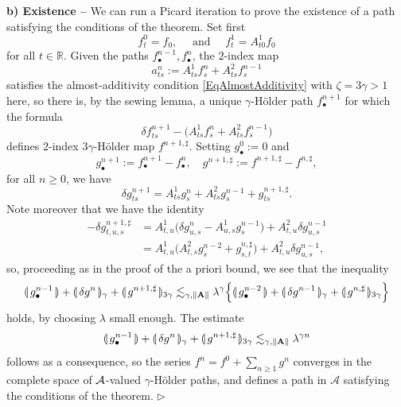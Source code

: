 \documentclass[11pt,a4paper]{amsart}
\newcommand{\RR}{\mathbb{R}}  \newcommand{\CC}{\mathbb{C}}  \newcommand{\LL}{\mathbb{L}}  \newcommand{\WW}{\mathbb{W}}
\renewcommand{\geq}{\geqslant}
\numberwithin{equation}{section} %
\newenvironment{Dem}{%
    \begin{list}{\hspace{0.5cm}{\sc Proof --}}{%
        \setlength{\topsep}{0pt}%
        \setlength{\leftmargin}{0pt}%
        \setlength{\rightmargin}{0pt}%
        \setlength{\listparindent}{0pt}%
        \setlength{\itemindent}{0pt}%
        \setlength{\parsep}{0pt}%
        \addtolength{\leftmargin}{20pt}%
        \addtolength{\rightmargin}{0pt}%
    } \item }{\hfill{\space $\rhd$}\end{list}\smallskip}
\begin{document}
\begin{Dem}
{\bf b) Existence --} We can run a Picard iteration to prove the existence of a path satisfying the conditions of the theorem. Set first
$$
f^0_t = f_0,\quad \textrm{ and } \quad f^1_t =A^1_{t0} f_0
$$ 
for all $t \in \RR$. Given the paths $f^{n-1}_\bullet, f^n_\bullet$, the $2$-index map 
$$
a^n_{ts} := A^1_{ts} f^n_s +A^2_{ts} f_s^{n - 1}
$$
satisfies the almost-additivity condition \eqref{EqAlmostAdditivity} with $\zeta=3\gamma>1$ here, so there is, by the sewing lemma, a unique $\gamma$-H\"older path $f^{n + 1}_\bullet$ for which the formula
$$ 
\delta f^{n + 1}_{ts} - \Big(A^1_{ts} f^n_s +A^2_{ts} f_s^{n - 1}\Big) 
$$
defines $2$-index $3\gamma$-H\"older map $f^{n + 1, \sharp}$. Setting $g^0_\bullet := 0$ and
$$
g^{n + 1}_\bullet := f^{n + 1}_\bullet - f^n_\bullet, \quad  g^{n + 1, \sharp} := f^{n + 1, \sharp} - f^{n, \sharp},
$$ 
for all $n \geq 0$, we have
$$
\delta g^{n + 1}_{ts} =A^1_{ts} g^n_s +A^2_{ts} g_s^{n - 1} + g^{n + 1, \sharp}_{ts}. 
$$
Note moreover that we have the identity
\begin{equation*}
\begin{split}
- \delta g^{n + 1, \sharp}_{t, u, s} &= A^1_{t, u} \Big(\delta  g^n_{u, s} -A^1_{u, s} g^{n - 1}_s\Big) +A^2_{t, u} \delta g^{n - 1}_{u, s} \\
&= A^1_{t, u} \Big(A^2_{t, s} g^{n - 2}_s + g^{n, \sharp}_{s, t}\Big) +A^2_{t, u} \delta g^{n - 1}_{u, s},
\end{split}
\end{equation*}
so, proceeding as in the proof of the a priori bound, we see that the inequality
$$
\llparenthesis\, g^{n - 1}_\bullet\,\rrparenthesis + \llparenthesis\, \delta g^n \,\rrparenthesis_\gamma + \llparenthesis\, g^{n + 1, \sharp} \,\rrparenthesis_{3 \gamma} \lesssim_{\gamma, \| {\bf A} \|} \lambda^\gamma \Big\{\llparenthesis\, g^{n - 2}_\bullet \,\rrparenthesis + \llparenthesis\, \delta g^{n - 1} \,\rrparenthesis_\gamma + \llparenthesis\, g^{n, \sharp} \,\rrparenthesis_{3 \gamma}\Big\}
$$  
holds, by choosing $\lambda$ small enough. The estimate
$$
\llparenthesis\, g^{n - 1}_\bullet\,\rrparenthesis + \llparenthesis\, \delta g^n \,\rrparenthesis_\gamma + \llparenthesis\, g^{n + 1, \sharp} \,\rrparenthesis_{3 \gamma} \lesssim_{\gamma, \| {\bf A} \|} \lambda^{\gamma n}
$$
follows as a consequence, so the series $f^n = f^0 + \sum_{n \geqslant 1} g^n$ converges in the complete space of $\mathcal{A}$-valued $\gamma$-H\"older paths, and defines a path in $\mathcal{A}$ satisfying the conditions of the theorem.
\end{Dem}
\end{document}
